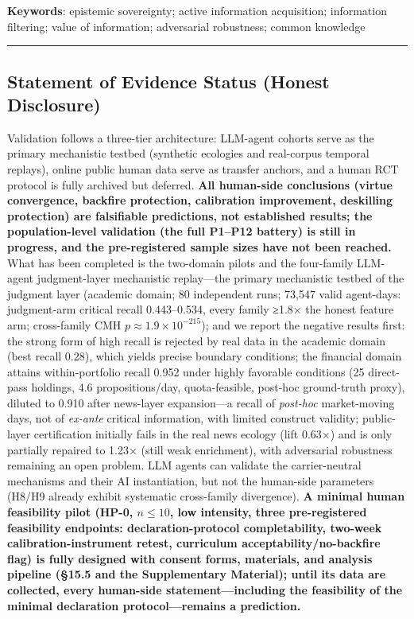 \documentclass[
  11pt]{article}
\begin{document}
\textbf{Keywords}: epistemic sovereignty; active information
acquisition; information filtering; value of information; adversarial
robustness; common knowledge

\begin{center}\rule{0.5\linewidth}{0.5pt}\end{center}

\subsection{Statement of Evidence Status (Honest
Disclosure)}\label{statement-of-evidence-status-honest-disclosure}

Validation follows a three-tier architecture: LLM-agent cohorts serve as
the primary mechanistic testbed (synthetic ecologies and real-corpus
temporal replays), online public human data serve as transfer anchors,
and a human RCT protocol is fully archived but deferred. \textbf{All
human-side conclusions (virtue convergence, backfire protection,
calibration improvement, deskilling protection) are falsifiable
predictions, not established results; the population-level validation
(the full P1--P12 battery) is still in progress, and the pre-registered
sample sizes have not been reached.} What has been completed is the
two-domain pilots and the four-family LLM-agent judgment-layer
mechanistic replay---the primary mechanistic testbed of the judgment
layer (academic domain; 80 independent runs; 73,547 valid agent-days:
judgment-arm critical recall 0.443--0.534, every family ≥1.8× the honest
feature arm; cross-family CMH \(p\approx1.9\times10^{-215}\)); and we
report the negative results first: the strong form of high recall is
rejected by real data in the academic domain (best recall 0.28), which
yields precise boundary conditions; the financial domain attains
within-portfolio recall 0.952 under highly favorable conditions (25
direct-pass holdings, 4.6 propositions/day, quota-feasible, post-hoc
ground-truth proxy), diluted to 0.910 after news-layer expansion---a
recall of \emph{post-hoc} market-moving days, not of \emph{ex-ante}
critical information, with limited construct validity; public-layer
certification initially fails in the real news ecology (lift 0.63×) and
is only partially repaired to 1.23× (still weak enrichment), with
adversarial robustness remaining an open problem. LLM agents can
validate the carrier-neutral mechanisms and their AI instantiation, but
not the human-side parameters (H8/H9 already exhibit systematic
cross-family divergence). \textbf{A minimal human feasibility pilot
(HP-0, \(n \le 10\), low intensity, three pre-registered feasibility
endpoints: declaration-protocol completability, two-week
calibration-instrument retest, curriculum acceptability/no-backfire
flag) is fully designed with consent forms, materials, and analysis
pipeline (§15.5 and the Supplementary Material); until its data are
collected, every human-side statement---including the feasibility of the
minimal declaration protocol---remains a prediction.}
\end{document}
